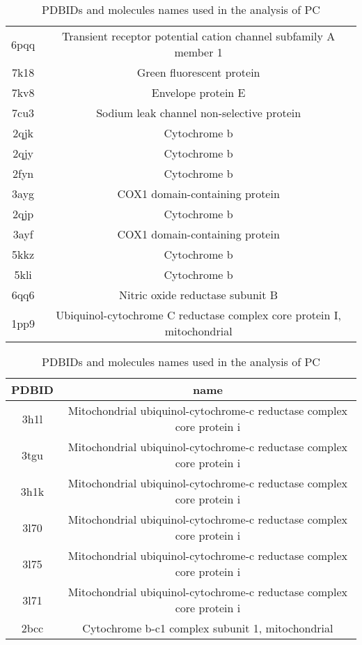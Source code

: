 \documentclass{article}
\begin{document}
\begin{table}[]
\begin{tabular}{c|c}
6pqq & Transient receptor potential cation channel subfamily A member 1 \\ 
7k18 & Green fluorescent protein \\ 
7kv8 & Envelope protein E \\ 
7cu3 & Sodium leak channel non-selective protein \\ 
2qjk & Cytochrome b \\ 
2qjy & Cytochrome b \\ 
2fyn & Cytochrome b \\ 
3ayg & COX1 domain-containing protein \\ 
2qjp & Cytochrome b \\ 
3ayf & COX1 domain-containing protein \\ 
5kkz & Cytochrome b \\ 
5kli & Cytochrome b \\ 
6qq6 & Nitric oxide reductase subunit B \\ 
1pp9 & Ubiquinol-cytochrome C reductase complex core protein I, mitochondrial \\ 
    \end{tabular}
    \caption{PDBIDs and molecules names used in the analysis of PC}
    \label{tab:my_label}
\end{table}

\begin{table}[]
    \centering
    \begin{tabular}{c|c}
PDBID & name \\
\hline
3h1l & Mitochondrial ubiquinol-cytochrome-c reductase complex core protein i \\ 
3tgu & Mitochondrial ubiquinol-cytochrome-c reductase complex core protein i \\ 
3h1k & Mitochondrial ubiquinol-cytochrome-c reductase complex core protein i \\ 
3l70 & Mitochondrial ubiquinol-cytochrome-c reductase complex core protein i \\ 
3l75 & Mitochondrial ubiquinol-cytochrome-c reductase complex core protein i \\ 
3l71 & Mitochondrial ubiquinol-cytochrome-c reductase complex core protein i \\ 
2bcc & Cytochrome b-c1 complex subunit 1, mitochondrial \\  
    \end{tabular}
    \caption{PDBIDs and molecules names used in the analysis of PC}
    \label{tab:my_label}
\end{table}
\end{document}
